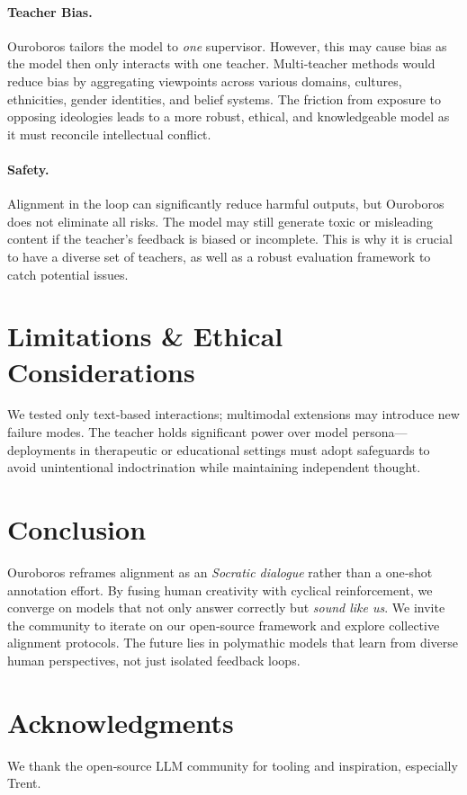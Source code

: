 \documentclass[11pt]{article}
\begin{document}
\paragraph{Teacher Bias.} Ouroboros tailors the model to \emph{one} supervisor.  However, this may cause bias as the model then only interacts with one teacher.  Multi‑teacher methods would reduce bias by aggregating viewpoints across various domains, cultures, ethnicities, gender identities, and belief systems.  The friction from exposure to opposing ideologies leads to a more robust, ethical, and knowledgeable model as it must reconcile intellectual conflict.
\paragraph{Safety.} Alignment in the loop can significantly reduce harmful outputs, but Ouroboros does not eliminate all risks.  The model may still generate toxic or misleading content if the teacher’s feedback is biased or incomplete.  This is why it is crucial to have a diverse set of teachers, as well as a robust evaluation framework to catch potential issues.

\section{Limitations \& Ethical Considerations}
We tested only text‑based interactions; multimodal extensions may introduce new failure modes.  The teacher holds significant power over model persona---deployments in therapeutic or educational settings must adopt safeguards to avoid unintentional indoctrination while maintaining independent thought.

\section{Conclusion}
Ouroboros reframes alignment as an \emph{Socratic dialogue} rather than a one‑shot annotation effort.  By fusing human creativity with cyclical reinforcement, we converge on models that not only answer correctly but \emph{sound like us}.  We invite the community to iterate on our open‑source framework and explore collective alignment protocols. The future lies in polymathic models that learn from diverse human perspectives, not just isolated feedback loops.

\section*{Acknowledgments}
We thank the open‑source LLM community for tooling and inspiration, especially Trent.
\end{document}
